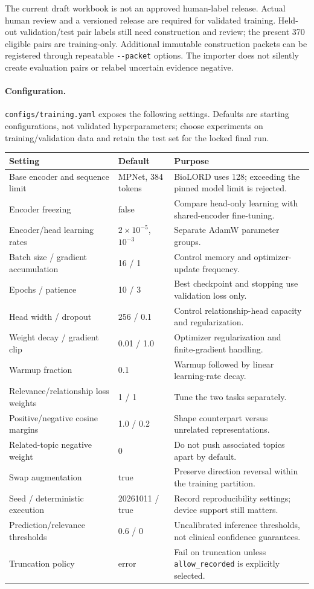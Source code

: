 \documentclass[10pt,letterpaper]{article}
\newcommand{\pathcode}[1]{\nolinkurl{#1}}
\begin{document}
The current draft workbook is not an approved human-label release. Actual
human review and a versioned release are required for validated training.
Held-out validation/test pair labels still need construction and review; the
present 370 eligible pairs are training-only. Additional immutable construction packets
can be registered through repeatable \pathcode{--packet} options. The importer
does not silently create evaluation pairs or relabel uncertain evidence negative.

\paragraph{Configuration.}
\pathcode{configs/training.yaml} exposes the following settings. Defaults are
starting configurations, not validated hyperparameters; choose experiments on
training/validation data and retain the test set for the locked final run.
\begin{longtable}{L{.31\linewidth}L{.22\linewidth}L{.38\linewidth}}
\toprule Setting & Default & Purpose\\\midrule
\endhead
Base encoder and sequence limit & MPNet, 384 tokens & BioLORD uses 128; exceeding the pinned model limit is rejected.\\
Encoder freezing & false & Compare head-only learning with shared-encoder fine-tuning.\\
Encoder/head learning rates & \(2\times10^{-5}\), \(10^{-3}\) & Separate AdamW parameter groups.\\
Batch size / gradient accumulation & 16 / 1 & Control memory and optimizer-update frequency.\\
Epochs / patience & 10 / 3 & Best checkpoint and stopping use validation loss only.\\
Head width / dropout & 256 / 0.1 & Control relationship-head capacity and regularization.\\
Weight decay / gradient clip & 0.01 / 1.0 & Optimizer regularization and finite-gradient handling.\\
Warmup fraction & 0.1 & Warmup followed by linear learning-rate decay.\\
Relevance/relationship loss weights & 1 / 1 & Tune the two tasks separately.\\
Positive/negative cosine margins & 1.0 / 0.2 & Shape counterpart versus unrelated representations.\\
Related-topic negative weight & 0 & Do not push associated topics apart by default.\\
Swap augmentation & true & Preserve direction reversal within the training partition.\\
Seed / deterministic execution & 20261011 / true & Record reproducibility settings; device support still matters.\\
Prediction/relevance thresholds & 0.6 / 0 & Uncalibrated inference thresholds, not clinical confidence guarantees.\\
Truncation policy & error & Fail on truncation unless \pathcode{allow_recorded} is explicitly selected.\\
\bottomrule
\end{longtable}
\end{document}
